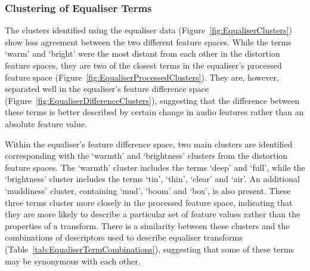 		\subsubsection*{Clustering of Equaliser Terms}
			The clusters identified using the equaliser data (Figure~\ref{fig:EqualiserClusters}) show
			less agreement between the two different feature spaces. While the terms `warm' and `bright' were
			the most distant from each other in the distortion feature spaces, they are two of the closest
			terms in the equaliser's processed feature space (Figure~\ref{fig:EqualiserProcessedClusters}).
			They are, however, separated well in the equaliser's feature difference space
			(Figure~\ref{fig:EqualiserDifferenceClusters}), suggesting that the difference between these terms
			is better described by certain change in audio features rather than an absolute feature value.
			
			Within the equaliser's feature difference space, two main clusters are identified corresponding
			with the `warmth' and `brightness' clusters from the distortion feature spaces. The `warmth'
			cluster includes the terms `deep' and `full', while the `brightness' cluster includes the terms
			`tin', `thin', `clear' and `air'. An additional `muddiness' cluster, containing `mud', `boom' and
			`box', is also present. These three terms cluster more closely in the processed feature space,
			indicating that they are more likely to describe a particular set of feature values rather than the
			properties of a transform. There is a similarity between these clusters and the combinations of
			descriptors used to describe equaliser transforms (Table~\ref{tab:EqualiserTermCombinations}),
			suggesting that some of these terms may be synonymous with each other.

